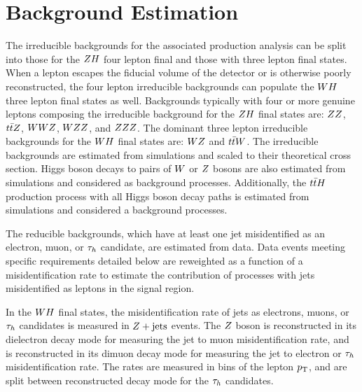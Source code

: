 \section{Background Estimation}
\label{sec:vh_background_estimation}

The irreducible backgrounds for the associated production analysis can
be split into those for the $ZH$ four lepton final and those
with three lepton final states. When a lepton escapes the fiducial
volume of the detector or is otherwise poorly reconstructed, the four
lepton irreducible backgrounds can populate the $WH$ three
lepton final states as well.
Backgrounds typically with four or more genuine leptons composing
the irreducible background for the $ZH$ final states are: $ZZ$, 
$t\bar{t}Z$, $WWZ$, $WZZ$, and $ZZZ$. The dominant
three lepton irreducible backgrounds for the $WH$ final states are:
$WZ$ and $t\bar{t} W$. The irreducible backgrounds are 
estimated from simulations and scaled to their theoretical cross section. Higgs 
boson decays to pairs of $W$ or $Z$ bosons 
are also estimated from simulations and considered as background processes. 
Additionally, the $t\bar{t}H$ production process with all Higgs boson decay
paths is estimated from simulations and considered a background processes.

The reducible backgrounds, which have at least one jet misidentified as an electron, 
muon, or $\tau_{h}$ candidate, are estimated from data. 
Data events meeting specific requirements detailed below are reweighted 
as a function of a misidentification rate to estimate the 
contribution of processes with jets misidentified as leptons in the signal region. 

In the $WH$ final states, the misidentification rate of jets as electrons, muons, 
or $\tau_{h}$ candidates is measured in $Z+\textrm{jets}$ events. The $Z$ boson is reconstructed 
in its dielectron decay mode for measuring the jet to muon  misidentification
rate, and is reconstructed in its dimuon decay mode for measuring the jet to electron
or $\tau_{h}$ misidentification rate.
The rates are measured in bins of the lepton $p_\mathrm{T}$, and are 
split between reconstructed decay mode for the $\tau_{h}$ candidates. 


